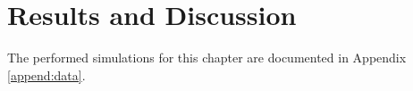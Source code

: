 \chapter{Results and Discussion}
\label{chap:results}

\thispagestyle{empty}
\newpage

The performed simulations for this chapter are documented in Appendix \ref{append:data}.